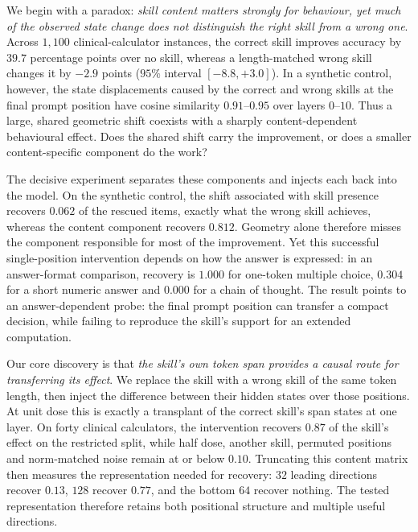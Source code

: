 \documentclass{article}
\begin{document}
We begin with a paradox: \emph{skill content matters strongly for behaviour,
yet much of the observed state change does not distinguish the right skill from
a wrong one}. Across $1{,}100$ clinical-calculator instances, the correct skill
improves accuracy by $39.7$ percentage points over no skill, whereas a
length-matched wrong skill changes it by $-2.9$ points ($95\%$ interval
$[-8.8,+3.0]$). In a synthetic control, however, the state displacements caused
by the correct and wrong skills at the final prompt position have cosine
similarity $0.91$--$0.95$ over layers $0$--$10$. Thus a large, shared geometric
shift coexists with a sharply content-dependent behavioural effect. Does the
shared shift carry the improvement, or does a smaller content-specific component
do the work?

The decisive experiment separates these components and injects each back into
the model. On the synthetic control, the shift associated with skill presence
recovers $0.062$ of the rescued items, exactly what the wrong skill achieves,
whereas the content component recovers $0.812$. Geometry alone therefore misses
the component responsible for most of the improvement. Yet this successful
single-position intervention depends on how the answer is expressed: in an
answer-format comparison, recovery is $1.000$ for one-token multiple choice,
$0.304$ for a short numeric answer and $0.000$ for a chain of thought. The
result points to an answer-dependent probe: the final prompt position can
transfer a compact decision, while failing to reproduce the skill's support for
an extended computation.

Our core discovery is that \emph{the skill's own token span provides a causal
route for transferring its effect}. We replace the skill with a wrong skill of
the same token length, then inject the difference between their hidden states
over those positions. At unit dose this is exactly a transplant of the correct
skill's span states at one layer. On forty clinical calculators, the intervention
recovers $0.87$ of the skill's effect on the restricted split, while half dose,
another skill, permuted positions and norm-matched noise remain at or below
$0.10$. Truncating this content matrix then measures the representation needed
for recovery: $32$ leading directions recover $0.13$, $128$ recover $0.77$, and
the bottom $64$ recover nothing. The tested representation therefore retains
both positional structure and multiple useful directions.
\end{document}
